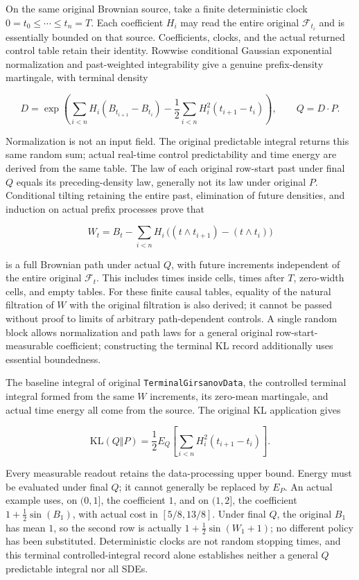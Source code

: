 \documentclass[
  english,
  11pt,
  oneside]{book}
\begin{document}
On the same original Brownian source, take a finite deterministic clock \(0=t_0\le\cdots\le t_n=T\). Each coefficient \(H_i\) may read the entire original \(\mathcal F_{t_i}\) and is essentially bounded on that source. Coefficients, clocks, and the actual returned control table retain their identity. Rowwise conditional Gaussian exponential normalization and past-weighted integrability give a genuine prefix-density martingale, with terminal density

\[D=\exp\!\left(\sum_{i<n}H_i(B_{t_{i+1}}-B_{t_i})
-\frac12\sum_{i<n}H_i^2(t_{i+1}-t_i)\right),\qquad Q=D\cdot P.\]

Normalization is not an input field. The original predictable integral returns this same random sum; actual real-time control predictability and time energy are derived from the same table. The law of each original row-start past under final \(Q\) equals its preceding-density law, generally not its law under original \(P\). Conditional tilting retaining the entire past, elimination of future densities, and induction on actual prefix processes prove that

\[W_t=B_t-\sum_{i<n}H_i\,\bigl((t\wedge t_{i+1})-(t\wedge t_i)\bigr)\]

is a full Brownian path under actual \(Q\), with future increments independent of the entire original \(\mathcal F_t\). This includes times inside cells, times after \(T\), zero-width cells, and empty tables. For these finite causal tables, equality of the natural filtration of \(W\) with the original filtration is also derived; it cannot be passed without proof to limits of arbitrary path-dependent controls. A single random block allows normalization and path laws for a general original row-start-measurable coefficient; constructing the terminal KL record additionally uses essential boundedness.

The baseline integral of original \nolinkurl{TerminalGirsanovData}, the controlled terminal integral formed from the same \(W\) increments, its zero-mean martingale, and actual time energy all come from the source. The original KL application gives

\[\mathrm{KL}(Q\Vert P)=\frac12 E_Q\!\left[\sum_{i<n}H_i^2(t_{i+1}-t_i)\right].\]

Every measurable readout retains the data-processing upper bound. Energy must be evaluated under final \(Q\); it cannot generally be replaced by \(E_P\). An actual example uses, on \((0,1]\), the coefficient \(1\), and on \((1,2]\), the coefficient \(1+\tfrac12\sin(B_1)\), with actual cost in \([5/8,13/8]\). Under final \(Q\), the original \(B_1\) has mean \(1\), so the second row is actually \(1+\tfrac12\sin(W_1+1)\); no different policy has been substituted. Deterministic clocks are not random stopping times, and this terminal controlled-integral record alone establishes neither a general \(Q\) predictable integral nor all SDEs.
\end{document}
